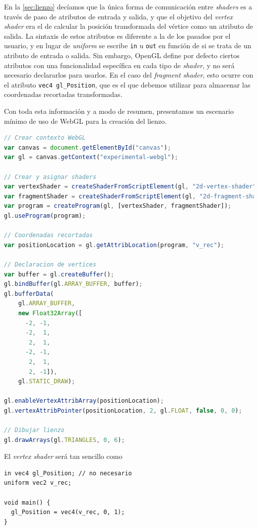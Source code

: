 En la \autoref{sec:lienzo} decíamos que la única forma de comunicación entre \textit{shaders} es a través de paso de atributos de entrada y salida, y que el objetivo del \textit{vertex shader} era el de calcular la posición transformada del vértice como un atributo de salida. La sintaxis de estos atributos es diferente a la de los pasados por el usuario, y en lugar de \textit{uniform} se escribe \texttt{in} u \texttt{out} en función de si se trata de un atributo de entrada o salida. Sin embargo, OpenGL define por defecto ciertos atributos con una funcionalidad específica en cada tipo de \textit{shader}, y no será necesario declararlos para usarlos. En el caso del \textit{fragment shader}, esto ocurre con el atributo \texttt{vec4 gl\_Position}, que es el que debemos utilizar para almacenar las coordenadas recortadas transformadas.\newline

Con toda esta información y a modo de resumen, presentamos un escenario mínimo de uso de WebGL \cite{webgl_ejemplo} para la creación del lienzo.
\begin{lstlisting}[language=JavaScript]
// Crear contexto WebGL
var canvas = document.getElementById("canvas");
var gl = canvas.getContext("experimental-webgl");

// Crear y asignar shaders
var vertexShader = createShaderFromScriptElement(gl, "2d-vertex-shader");
var fragmentShader = createShaderFromScriptElement(gl, "2d-fragment-shader");
var program = createProgram(gl, [vertexShader, fragmentShader]);
gl.useProgram(program);

// Coordenadas recortadas
var positionLocation = gl.getAttribLocation(program, "v_rec");

// Declaracion de vertices
var buffer = gl.createBuffer();
gl.bindBuffer(gl.ARRAY_BUFFER, buffer);
gl.bufferData(
    gl.ARRAY_BUFFER,
    new Float32Array([
      -2, -1,
      -2,  1,
       2,  1,
      -2, -1,
       2,  1,
       2, -1]),
    gl.STATIC_DRAW);
    
gl.enableVertexAttribArray(positionLocation);
gl.vertexAttribPointer(positionLocation, 2, gl.FLOAT, false, 0, 0);

// Dibujar lienzo
gl.drawArrays(gl.TRIANGLES, 0, 6);
\end{lstlisting}
El \textit{vertex shader} será tan sencillo como
\begin{lstlisting}
in vec4 gl_Position; // no necesario
uniform vec2 v_rec;

void main() {
  gl_Position = vec4(v_rec, 0, 1);
}
\end{lstlisting}

